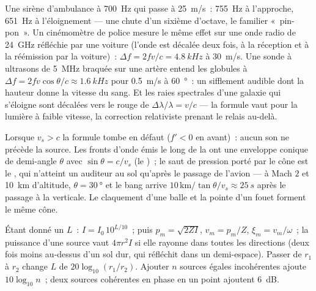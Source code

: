 \begin{example}\label{ex:b2:sound-waves:dopplerex}
Une sirène d'ambulance à \qty{700}{Hz} qui passe à \qty{25}{m/s}~: \qty{755}{Hz}
à l'approche, \qty{651}{Hz} à l'éloignement --- une chute d'un sixième d'octave,
le familier «~pin-pon~». Un cinémomètre de police mesure le même
effet sur une onde radio de \qty{24}{GHz} réfléchie par une voiture (l'onde est
décalée deux fois, à la réception et à la réémission par la voiture)~: $\Delta f = 2fv/c =
\qty{4.8}{kHz}$ à \qty{30}{m/s}. Une sonde à ultrasons de \qty{5}{MHz} braquée sur
une artère entend les globules à $\Delta f = 2fv\cos\theta/c \approx \qty{1.6}{kHz}$
pour \qty{0.5}{m/s} à \qty{60}{\degree}~: un sifflement audible dont la hauteur donne la
vitesse du sang. Et les raies spectrales d'une galaxie qui s'éloigne sont décalées
vers le rouge de $\Delta\lambda/\lambda = v/c$ --- la formule vaut pour la lumière à faible vitesse,
la correction relativiste prenant le relais au-delà.
\end{example}

\begin{remark}[Supersonique]\label{rem:b2:sound-waves:mach}
Lorsque $v_s > c$ la formule tombe en défaut ($f' < 0$ en avant)~: aucun son ne précède
la source. Les fronts d'onde émis le long de la  ont une enveloppe
conique de demi-angle $\theta$ avec $\sin\theta = c/v_s$ (le \emph{})~;
le saut de pression porté par le cône est le , qui n'atteint
un auditeur au sol qu'après le passage de l'avion --- à
Mach $2$ et \qty{10}{km} d'altitude, $\theta = \qty{30}{\degree}$ et le bang
arrive $10\,\text{km}/\tan\theta/v_s \approx \qty{25}{s}$ après le passage
à la verticale. Le claquement d'une balle et la pointe d'un fouet forment le même cône.
\end{remark}

\begin{method}\label{met:b2:sound-waves:method}
Étant donné un  $L$~: $I = I_0\,10^{L/10}$~; puis $p_m = \sqrt{2ZI}$,
$v_m = p_m/Z$, $\xi_m = v_m/\omega$~; la puissance d'une source vaut $4\pi r^2I$ si elle
rayonne dans toutes les directions (deux fois moins au-dessus d'un sol dur, qui
réfléchit dans un demi-espace). Passer de $r_1$ à $r_2$ change $L$ de
$20\log_{10}(r_1/r_2)$. Ajouter $n$ sources égales incohérentes ajoute
$10\log_{10}n$~; deux sources cohérentes en phase en un point ajoutent \qty{6}{dB}.
\end{method}

